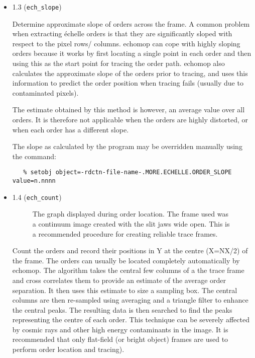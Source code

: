 \begin{itemize}
\item {} {1.3} (\verb+ech_slope+)

Determine approximate slope of orders across the frame.
A common problem when extracting \'{e}chelle orders is that they are
significantly sloped with respect to the pixel rows/ columns.
{\sc echomop} can cope with highly sloping orders because it works
by first locating a single point in each order and then using this as
the start point for tracing the order path. {\sc echomop} also calculates
the approximate slope of the orders prior to tracing, and uses this
information to predict the order position when tracing fails (usually
due to contaminated pixels).

The estimate obtained by this method is however, an average value
over all orders. It is therefore not applicable when the orders are
highly distorted, or when each order has a different slope.

The slope as calculated by the program may be overridden manually
using the   command:

\begin{verbatim}
   % setobj object=-rdctn-file-name-.MORE.ECHELLE.ORDER_SLOPE value=n.nnnn
\end{verbatim}


\item {} {1.4} (\verb+ech_count+)

\begin{figure}
\begin{center}
{\leavevmode\epsfysize=136mm}

\parbox{140mm}{
\caption{The graph displayed during order location.  The frame used
was a continuum image created with the slit jaws wide open.  This is
a recommended procedure for creating reliable trace frames.}
\label{fi_locate}
}
\end{center}
\end{figure}

Count the orders and record their positions in Y at the centre (X=NX/2)
of the frame.
The orders can usually be located completely automatically by
{\sc echomop.} The algorithm takes the central few columns of a the trace
frame and cross correlates them to provide an estimate of the average
order separation. It then uses this estimate to size a sampling box.
The central columns are then re-sampled using averaging and a
triangle filter to enhance the central peaks. The resulting data is
then searched to find the peaks representing the centre of each
order.
This technique can be severely affected by cosmic rays and other high
energy contaminants in the image. It is recommended that only
flat-field (or bright object) frames are used to perform order location
and tracing).


\end{itemize}

